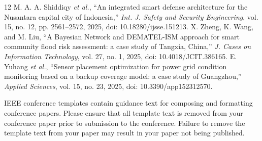 \documentclass[conference]{IEEEtran}
\begin{document}
\begin{thebibliography}{12}
 M. A. A. Shiddiqy \emph{et al.}, ``An integrated smart defense architecture for the Nusantara capital city of Indonesia,'' \emph{Int. J. Safety and Security Engineering}, vol. 15, no. 12, pp. 2561--2572, 2025, doi: 10.18280/ijsse.151213.
 X. Zheng, K. Wang, and M. Liu, ``A Bayesian Network and DEMATEL-ISM approach for smart community flood risk assessment: a case study of Tangxia, China,'' \emph{J. Cases on Information Technology}, vol. 27, no. 1, 2025, doi: 10.4018/JCIT.386165.
 E. Yuhang \emph{et al.}, ``Sensor placement optimization for power grid condition monitoring based on a backup coverage model: a case study of Guangzhou,'' \emph{Applied Sciences}, vol. 15, no. 23, 2025, doi: 10.3390/app152312570.
\end{thebibliography}

\color{red}
IEEE conference templates contain guidance text for composing and formatting conference papers. Please ensure that all template text is removed from your conference paper prior to submission to the conference. Failure to remove the template text from your paper may result in your paper not being published.
\end{document}
